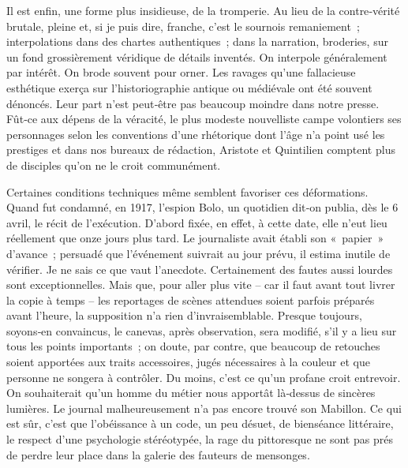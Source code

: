\documentclass[french,twoside]{book} %
\newcommand{\astermono}{\medskip\centerline{\color{rubric}\large\selectfont{\syms ✻}}\medskip\par}%
\begin{document}
\astermono

\noindent Il est enfin, une forme plus insidieuse, de la tromperie. Au lieu de la contre‑vérité brutale, pleine et, si je puis dire, franche, c’est le sour­nois remaniement ; interpolations dans des chartes authentiques ; dans la narration, broderies, sur un fond grossièrement véridique de détails inventés. On interpole généralement par intérêt. On brode souvent pour orner. Les ravages qu’une fallacieuse esthétique exerça sur l’historio­graphie antique ou médiévale ont été souvent dénoncés. Leur part n’est peut‑être pas beaucoup moindre dans notre presse. Fût‑ce aux dépens de la véracité, le plus modeste nouvelliste campe volontiers ses person­nages selon les conventions d’une rhétorique dont l’âge n’a point usé les prestiges et dans nos bureaux de rédaction, Aristote et Quintilien comp­tent plus de disciples qu’on ne le croit communément.\par
Certaines conditions techniques même semblent favoriser ces défor­mations. Quand fut condamné, en 1917, l’espion Bolo, un quotidien dit‑on publia, dès le 6 avril, le récit de l’exécution. D’abord fixée, en effet, à cette date, elle n’eut lieu réellement que onze jours plus tard. Le journaliste avait établi son « papier » d’avance ; persuadé que l’événement suivrait au jour prévu, il estima inutile de vérifier. Je ne sais ce que vaut l’anecdote. Certainement des fautes aussi lourdes sont exception­nelles. Mais que, pour aller plus vite – car il faut avant tout livrer la copie à temps – les reportages de scènes attendues soient parfois préparés avant l’heure, la supposition n’a rien d’invraisemblable. Presque toujours, soyons‑en convaincus, le canevas, après observation, sera modifié, s’il y a lieu sur tous les points importants ; on doute, par contre, que beaucoup de retouches soient apportées aux traits accessoires, jugés nécessaires à la couleur et que personne ne songera à contrôler. Du moins, c’est ce qu’un profane croit entrevoir. On souhaiterait qu’un homme du métier nous apportât là‑dessus de sincères lumières. Le journal malheureusement  
\label{p46} n’a pas encore trouvé son Mabillon. Ce qui est sûr, c’est que l’obéissance à un code, un peu désuet, de bienséance littéraire, le respect d’une psy­chologie stéréotypée, la rage du pittoresque ne sont pas prés de perdre leur place dans la galerie des fauteurs de mensonges.\par

\astermono
\end{document}
